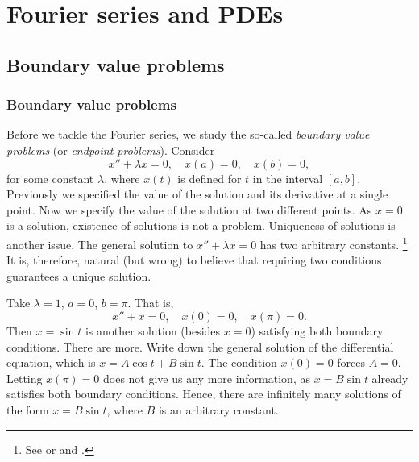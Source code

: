 \chapter{Fourier series and PDEs} \label{FS:chapter}


\section{Boundary value problems} \label{bvp:section}



\subsection{Boundary value problems}

Before we tackle the Fourier series, we study
the so-called 
\emph{boundary value problems}
(or \emph{endpoint problems}).  Consider
\begin{equation*}
x'' + \lambda x = 0, \quad x(a) = 0, \quad x(b) = 0,
\end{equation*}
for some constant $\lambda$, where $x(t)$ is defined for $t$ in the interval
$[a,b]$.
Previously we specified the value of the solution and its derivative
at a single point.  Now we specify the value of the solution at two different
points.  As $x=0$ is a solution, existence of
solutions is not a problem.  Uniqueness of solutions is another issue.
The general solution to $x'' + \lambda x = 0$ has two
arbitrary constants.%
\footnote{%
See  or  and
.}
It is, therefore,
natural (but wrong) to believe that requiring two
conditions guarantees a unique solution.

\begin{example}
Take $\lambda = 1$,
$a=0$, $b=\pi$.  That is,
\begin{equation*}
x'' + x = 0, \quad x(0) = 0, \quad x(\pi) = 0.
\end{equation*}
Then $x = \sin t$ is another solution (besides $x=0$) satisfying both boundary
conditions.  There are more.  Write down the general
solution of the differential equation, which is $x= A \cos t + B \sin t$.
The condition $x(0) = 0$ forces $A=0$.  Letting $x(\pi) = 0$ does not
give us any more information, as $x = B \sin t$ already satisfies both
boundary conditions.
Hence, there are infinitely many solutions of the form $x = B \sin t$,
where $B$ is an arbitrary constant.
\end{example}

